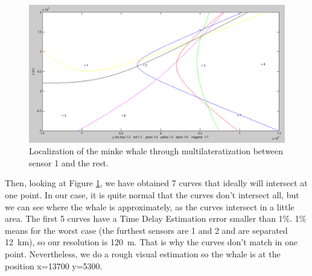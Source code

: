 \begin{figure}[htb]
	\begin{center}
		\includegraphics[width=1\textwidth]{figures/7_local.png}
	\end{center}
	\caption{Localization of the minke whale through multilateratization between sensor 1 and the rest.}
	\label{fig:local}
\end{figure}

Then, looking at Figure \ref{fig:local}, we have obtained 7 curves that ideally will intersect at one point. In our case, it is quite normal that the curves don't intersect all, but we can see where the whale is approximately, as the curves intersect in a little area. The first 5 curves have a Time Delay Estimation error smaller than 1\%. 1\% means for the worst case (the furthest sensors are 1 and 2 and are separated \SI{12}{\kilo\meter}), so our resolution is \SI{120}{\meter}. That is why the curves don't match in one point. Nevertheless, we do a rough visual estimation so the whale is at the position x=13700 y=5300.
